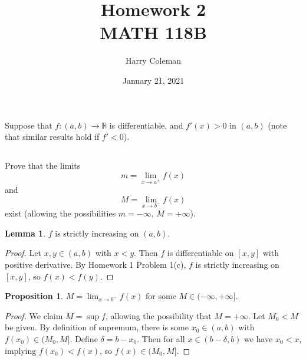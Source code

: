 \documentclass[12pt]{article}
\title{Homework 2\\
    \large MATH 118B
}
\author{Harry Coleman}
\date{January 21, 2021}
\newenvironment{problem}
    {\begin{lrbox}{\mybox}\begin{minipage}{0.98\textwidth}}
    {\end{minipage}\end{lrbox}\begin{center}\framebox[\textwidth]{\usebox{\mybox}}\end{center}}
\theoremstyle{definition}
\newtheorem{proposition}{Proposition}
\newtheorem{lemma}{Lemma}
\newcommand{\ds}{\displaystyle}
\newcommand{\R}{\mathbb{R}}
\begin{document}
\maketitle

\section{}
\begin{problem}
    Suppose that $f:(a,b)\to \R$ is differentiable, and $f'(x)>0$ in $(a,b)$ (note that similar results hold if $f'<0$).
\end{problem}

\subsection{}
\begin{problem}
    Prove that the limits 
    \begin{equation}
    m = \lim_{x\to a^+} f(x)
    \end{equation}
    and
    \begin{equation}
    M = \lim_{x\to b^-} f(x)
    \end{equation}
    exist (allowing the possibilities $m=-\infty$, $M=+\infty$).
\end{problem}

\begin{lemma}
    $f$ is strictly increasing on $(a, b)$.
\end{lemma}

\begin{proof}
    Let $x, y \in (a, b)$ with $x < y$. Then $f$ is differentiable on $[x, y]$ with positive derivative. By Homework 1 Problem 1(c), $f$ is strictly increasing on $[x, y]$, so $f(x) < f(y)$.
    
\end{proof}

\begin{proposition}
    $M = \ds\lim_{x\to b^-} f(x)$ for some $M \in (-\infty, +\infty]$.
\end{proposition}

\begin{proof}
    We claim $M = \sup f$, allowing the possibility that $M = +\infty$. Let $M_0 < M$ be given. By definition of supremum, there is some $x_0 \in (a, b)$ with $f(x_0) \in (M_0, M]$. Define $\delta = b - x_0$. Then for all $x \in (b - \delta, b)$ we have $x_0 < x$, implying $f(x_0) < f(x)$, so $f(x) \in (M_0, M]$.
    
\end{proof}
\end{document}
